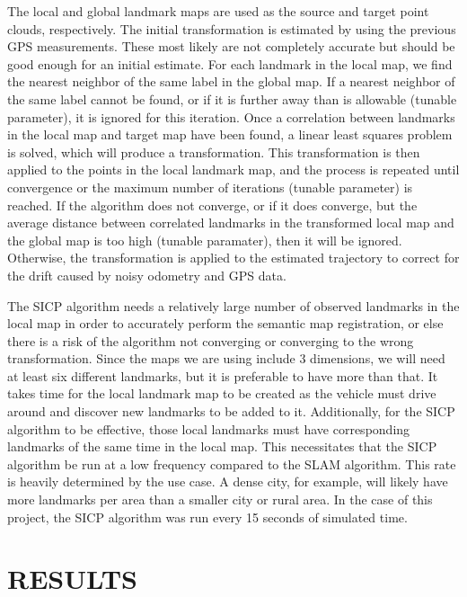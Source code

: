 \documentclass[letterpaper, 10 pt, conference]{ieeeconf}  %
\begin{document}
The local and global landmark maps are used as the source and target point clouds, respectively. The initial transformation is estimated by using the previous GPS measurements. These most likely are not completely accurate but should be good enough for an initial estimate. For each landmark in the local map, we find the nearest neighbor \cite{cNN} of the same label in the global map. If a nearest neighbor of the same label cannot be found, or if it is further away than is allowable (tunable parameter), it is ignored for this iteration. Once a correlation between landmarks in the local map and target map have been found, a linear least squares problem is solved, which will produce a transformation. This transformation is then applied to the points in the local landmark map, and the process is repeated until convergence or the maximum number of iterations (tunable parameter) is reached. If the algorithm does not converge, or if it does converge, but the average distance between correlated landmarks in the transformed local map and the global map is too high (tunable paramater), then it will be ignored. Otherwise, the transformation is applied to the estimated trajectory to correct for the drift caused by noisy odometry and GPS data.

The SICP algorithm needs a relatively large number of observed landmarks in the local map in order to accurately perform the semantic map registration, or else there is a risk of the algorithm not converging or converging to the wrong transformation. Since the maps we are using include 3 dimensions, we will need at least six different landmarks, but it is preferable to have more than that. It takes time for the local landmark map to be created as the vehicle must drive around and discover new landmarks to be added to it. Additionally, for the SICP algorithm to be effective, those local landmarks must have corresponding landmarks of the same time in the local map. This necessitates that the SICP algorithm be run at a low frequency compared to the SLAM algorithm. This rate is heavily determined by the use case. A dense city, for example, will likely have more landmarks per area than a smaller city or rural area. In the case of this project, the SICP algorithm was run every 15 seconds of simulated time.


\section{RESULTS}
\end{document}
